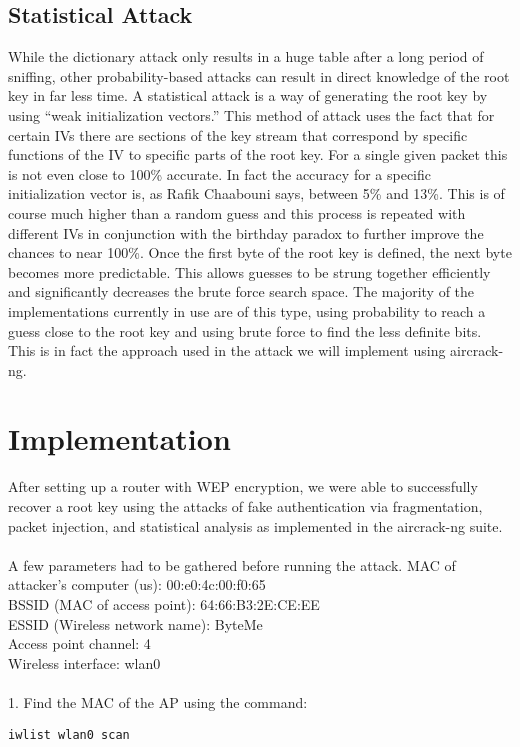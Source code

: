 \documentclass[12pt]{article}
\begin{document}
\subsection{Statistical Attack}
While the dictionary attack only results in a huge table after a long period of sniffing, other probability-based attacks can result in direct knowledge of the root key in far less time. A statistical attack is a way of generating the root key by using “weak initialization vectors.” This method of attack uses the fact that for certain IVs there are sections of the key stream that correspond by specific functions of the IV to specific parts of the root key. For a single given packet this is not even close to 100\% accurate. In fact the accuracy for a specific initialization vector is, as Rafik Chaabouni says, between 5\% and 13\%. This is of course much higher than a random guess and this process is repeated with different IVs in conjunction with the birthday paradox to further improve the chances to near 100\%. Once the first byte of the root key is defined, the next byte becomes more predictable. This allows guesses to be strung together efficiently and significantly decreases the brute force search space. The majority of the implementations currently in use are of this type, using probability to reach a guess close to the root key and using brute force to find the less definite bits. This is in fact the approach used in the attack we will implement using aircrack-ng.



\newpage
\section{Implementation}
\label{sec:implmnt}
After setting up a router with WEP encryption, we were able to successfully recover a root key using the attacks of fake authentication via fragmentation, packet injection, and statistical analysis as implemented in the aircrack-ng suite.
\\\\
A few parameters had to be gathered before running the attack.
MAC of attacker's computer (us): 00:e0:4c:00:f0:65\\
BSSID (MAC of access point): 64:66:B3:2E:CE:EE\\
ESSID (Wireless network name): ByteMe\\
Access point channel: 4\\
Wireless interface: wlan0\\
\\
1. Find the MAC of the AP using the command:\\
\begin{center}
\texttt{iwlist wlan0 scan}
\end{center}
\end{document}
